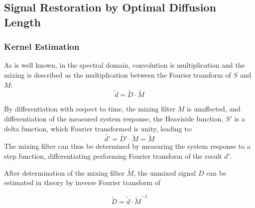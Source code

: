 \documentclass[../../CompleteThesis/Complete_1stDraft]{subfiles}
\begin{document}
	
	\subsection[Signal Restoration][Signal Restoration]{Signal Restoration by Optimal Diffusion Length}
	\label{Subsec:SignalAnalysis_BackDiffusion_SignalRestoration}
	\subsubsection{Kernel Estimation}
	\label{Subsubsec:SignalAnalysis_BackDiffusion_SignalRestoration_KernelEstimation}
	As is well known, in the spectral domain, convolution is multiplication and the mixing is described as the multiplication between the Fourier transform of $S$ and $M$:
	\begin{equation}
		\tilde{d} = \tilde{D} \cdot \tilde{M}
	\end{equation}
	
	
	By differentiation with respect to time, the mixing filter $M$ is unaffected, and differentiation of the measured system response, the Heaviside function, $S'$ is a delta function, which Fourier transformed is unity, leading to:
	\begin{equation}
		\tilde{d'} = \tilde{D'} \cdot \tilde{M} = \tilde{M}
	\end{equation}
	The mixing filter can thus be determined by measuring the system response to a step function, differentiating performing Fourier transform of the result $d'$.
	
	After determination of the mixing filter $\tilde{M}$, the unmixed signal $D$ can be estimated in theory by inverse Fourier transform of
	
	
	\begin{equation}
		\tilde{D} = \tilde{d}\cdot\tilde{M}^{-1}
		\label{eq:Restoration}
	\end{equation}
	
\end{document}
